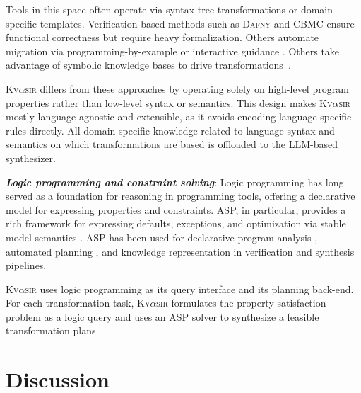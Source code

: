 \documentclass[nonacm,sigplan,review]{acmart}
\newcommand{\sys}{{\scshape Kv{$\alpha$}sir}\xspace}
\newcommand{\heading}[1]{\vspace{2pt}\noindent\textbf{\emph{#1}}:\enspace}
\begin{document}
Tools in this space often operate via syntax-tree transformations or
domain-specific templates.
Verification-based methods such as \textsc{Dafny}
\cite{leino2016dafny} and \textsc{CBMC} \cite{Clarke04} ensure functional correctness
but require heavy formalization.
Others automate migration via
programming-by-example or interactive guidance \cite{gulwani2017program, le2017interactive}.
Others take advantage of symbolic knowledge bases to drive transformations~\cite{burson1990program}.

\sys differs from these approaches by operating solely on high-level program
properties rather than low-level syntax or semantics.
This design makes \sys
mostly language-agnostic and extensible, as it avoids encoding language-specific rules
directly.
All domain-specific knowledge related to language
syntax and semantics on which transformations are based is offloaded to the LLM-based synthesizer.

\heading{Logic programming and constraint solving}
Logic programming has long served as a foundation for reasoning in programming
tools, offering a declarative model for expressing properties and constraints.
ASP, in particular, provides a rich framework for
expressing defaults, exceptions, and optimization via stable model semantics
\cite{Gelfond_2000, Gelfond_2002, Eiter_2009}. 
ASP has been used for
declarative program analysis \cite{benton2007interactive}, automated planning
\cite{nguyen2020explainable, son2022answersetplanningsurvey}, and knowledge
representation in verification and synthesis pipelines.

\sys uses logic programming as its query interface and its planning back-end.
For each transformation task, \sys formulates the property-satisfaction problem as a logic query and uses an ASP solver to synthesize a feasible transformation plans.

\section{Discussion}
\label{sec:discussion}
\end{document}
